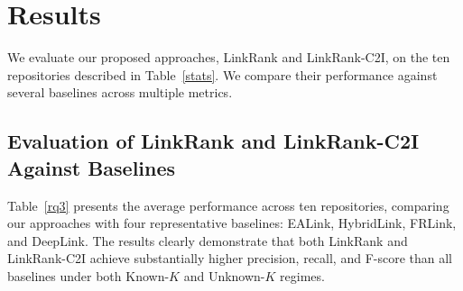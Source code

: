 \section{Results}

We evaluate our proposed approaches, LinkRank and LinkRank-C2I, on the ten repositories described in Table~\ref{stats}. We compare their performance against several baselines across multiple metrics.


\subsection{Evaluation of LinkRank and LinkRank-C2I Against Baselines}

Table~\ref{rq3} presents the average performance across ten repositories, comparing our approaches with four representative baselines: EALink, HybridLink, FRLink, and DeepLink. The results clearly demonstrate that both LinkRank and LinkRank-C2I achieve substantially higher precision, recall, and F-score than all baselines under both Known-$K$ and Unknown-$K$ regimes.


